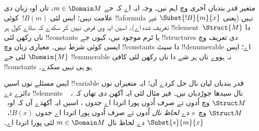\documentclass[../../../include/open-logic-section]{subfiles}
\begin{document}
\begin{explain}
متغیر قدر بندیاں آخری
 وچ اہم نیں۔ وجہ
ایہ اے کہ جے $m \in \Domain M$، تاں اوہ زبان دی علامت نہیں؛
ایس لئی $!B(m)$~کوئی !!a{formula} نہیں (یعنی
$\Subst{!B}{m}{x}$ غیر تعریف شدہ اے)۔ اسیں ایہ وی فرض نہیں
کر سکدے کہ ساڈے کول ہر !!{element}~$\Struct{M}$ دا ناں رکھن
لئی !!{constant}s یا ٹرم موجود نیں، کیوں جے !!{structure}s دی
تعریف وچ ایسی کوئی شرط نہیں۔ معیاری زبان وچ !!{constant}s دا
سیٹ !!{denumerable} اے؛ ایس لئی جے $\Domain{M}$
!!{enumerable} نہ ہووے تاں ہر شے دا ناں رکھن لئی کافی
!!{constant}s ہو ہی نہیں سکدے۔

ایس مسئلے نوں اسیں !!{variable} قدر بندیاں لیان نال حل کردے
آں؛ ایہ متغیراں نوں دائرے دے !!{element}s نال سیدھا جوڑدیاں
نیں۔ فیر مثال لئی ایہ آکھن دی تھاں کہ
،
~$\Struct M$ وچ اُدوں تے صرف اُدوں پورا اتردا اے جدوں
،
اسیں ایہ آکھدے آں کہ اوہ~$\Struct M$ وچ~$s$ دے
\emph{لحاظ نال} اُدوں تے صرف اُدوں پورا اتردا اے جدوں
$!B(x)$،~$\Subst{s}{m}{x}$ دے لحاظ نال
 $m \in \Domain M$ لئی پورا اتردا اے۔
\end{explain}
\end{document}
